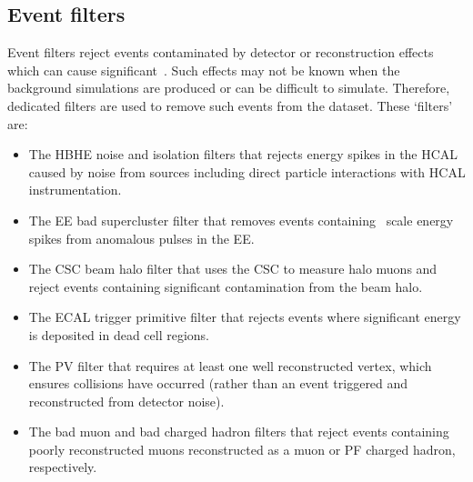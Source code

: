 \subsection{Event filters}
\label{sec:event_filters}
Event filters reject events contaminated by detector or reconstruction effects
which can cause significant~\met. Such effects may not be known when the 
background simulations are produced or can be difficult to simulate. Therefore,
dedicated filters are used to remove such events from the dataset. These `\met filters' 
are:

\begin{itemize}
\item The HBHE noise and isolation filters that rejects energy spikes in the HCAL caused by noise from sources 
including direct particle interactions with HCAL instrumentation.
\item The EE bad supercluster filter that removes events containing \TeV~scale energy spikes from anomalous
pulses in the EE.
\item The CSC beam halo filter that uses the CSC to measure halo muons and reject events containing 
significant contamination from the beam halo.
\item The ECAL trigger primitive filter that rejects events where significant energy is deposited in dead cell regions.
\item The PV filter that requires at least one well reconstructed vertex, which ensures collisions have occurred (rather than an event triggered and reconstructed from detector noise).
\item The bad muon and bad charged hadron filters that reject events containing poorly reconstructed muons reconstructed as 
a muon or PF charged hadron, respectively.
\end{itemize}

